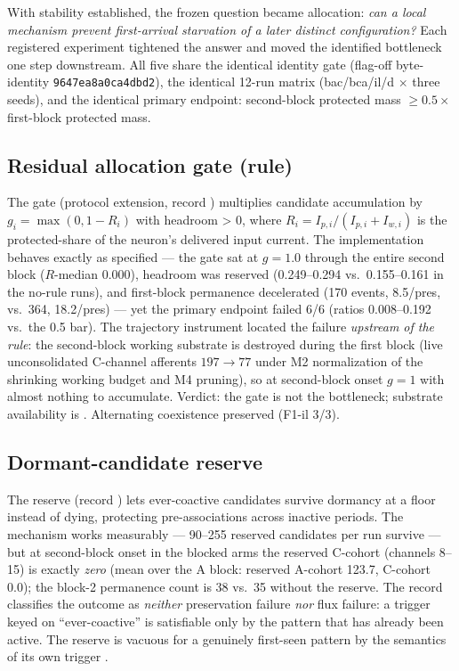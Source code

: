 With stability established, the frozen question became allocation:
\emph{can a local mechanism prevent first-arrival starvation of a later
distinct configuration?} Each registered experiment tightened the
answer and moved the identified bottleneck one step downstream. All
five share the identical identity gate (flag-off byte-identity
\texttt{9647ea8a0ca4dbd2}), the identical 12-run matrix (bac/bca/il/d
\(\times\) three seeds), and the identical primary endpoint:
second-block protected mass \(\ge 0.5 \times\) first-block protected
mass.

\subsection{Residual allocation gate (rule)}

The gate (protocol \cite{cllaprot} extension, record \cite{rule})
multiplies candidate accumulation by \(g_i = \max(0,1-R_i)\) with
headroom > 0, where \(R_i = I_{p,i}/(I_{p,i}+I_{w,i})\) is the
protected-share of the neuron's delivered input current. The
implementation behaves exactly as specified --- the gate sat at
\(g = 1.0\) through the entire second block (\(R\)-median 0.000),
headroom was reserved (0.249--0.294 vs.\ 0.155--0.161 in the no-rule
runs), and first-block permanence decelerated (170 events, 8.5/pres,
vs.\ 364, 18.2/pres) --- yet the primary endpoint failed 6/6 (ratios
0.008--0.192 vs.\ the 0.5 bar). The trajectory instrument located the
failure \emph{upstream of the rule}: the second-block working substrate
is destroyed during the first block (live unconsolidated C-channel
afferents \(197 \to 77\) under M2 normalization of the shrinking
working budget and M4 pruning), so at second-block onset
\(g=1\) with almost nothing to accumulate. Verdict: the gate is not the
bottleneck; substrate availability is \cite{rule}. Alternating
coexistence preserved (F1-il 3/3).

\subsection{Dormant-candidate reserve}

The reserve (record \cite{reserve}) lets ever-coactive candidates
survive dormancy at a floor instead of dying, protecting pre-associations
across inactive periods. The mechanism works measurably --- 90--255
reserved candidates per run survive --- but at second-block onset in the
blocked arms the reserved C-cohort (channels 8--15) is exactly
\emph{zero} (mean over the A block: reserved A-cohort 123.7, C-cohort
0.0); the block-2 permanence count is 38 vs.\ 35 without the reserve.
The record classifies the outcome as \emph{neither} preservation
failure \emph{nor} flux failure: a trigger keyed on ``ever-coactive''
is satisfiable only by the pattern that has already been active. The
reserve is vacuous for a genuinely first-seen pattern by the semantics
of its own trigger \cite{reserve}.

